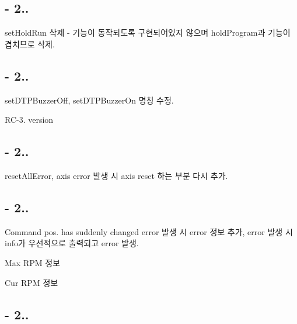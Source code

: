 \subsection*{-\/ 2..}


\begin{DoxyEnumerate}
\item set\-Hold\-Run 삭제 -\/ 기능이 동작되도록 구현되어있지 않으며 hold\-Program과 기능이 겹치므로 삭제.
\end{DoxyEnumerate}

\subsection*{-\/ 2..}


\begin{DoxyEnumerate}
\item set\-D\-T\-P\-Buzzer\-Off, set\-D\-T\-P\-Buzzer\-On 명칭 수정.
\item R\-C-\/3. version
\end{DoxyEnumerate}

\subsection*{-\/ 2..}


\begin{DoxyEnumerate}
\item reset\-All\-Error, axis error 발생 시 axis reset 하는 부분 다시 추가.
\end{DoxyEnumerate}

\subsection*{-\/ 2..}


\begin{DoxyEnumerate}
\item Command pos. has suddenly changed error 발생 시 error 정보 추가, error 발생 시 info가 우선적으로 출력되고 error 발생.
\begin{DoxyItemize}
\item Max R\-P\-M 정보
\item Cur R\-P\-M 정보
\end{DoxyItemize}
\end{DoxyEnumerate}

\subsection*{-\/ 2..}


